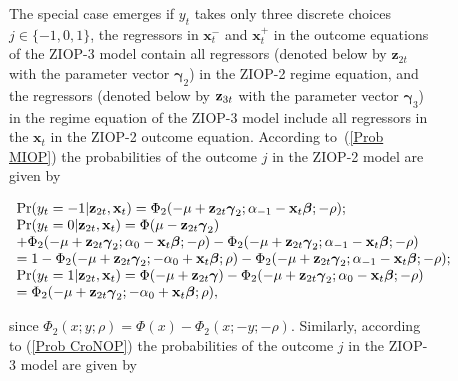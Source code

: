 \documentclass[letterpaper,fleqn,12pt]{article}
\begin{document}
\begin{figure}[H]
\begin{onehalfspace}
The special case emerges if $y_{t}$ takes only three discrete choices $j\in
\{-1,0,1\}$, the regressors in $\mathbf{x}_{t}^{-}$ and $\mathbf{x}_{t}^{+}$
in the outcome equations of the ZIOP-3 model contain all regressors (denoted
below by $\mathbf{z}_{2t}$ with the parameter vector $\mathbf{\gamma }_{2}$)
in the ZIOP-2 regime equation, and the regressors (denoted below by $\mathbf{%
z}_{3t}$ with the parameter vector $\mathbf{\gamma }_{3}$) in the regime
equation of the ZIOP-3 model include all regressors in the $\mathbf{x}_{t}$
in the ZIOP-2 outcome equation. According to\ (\ref{Prob MIOP}) the
probabilities of the outcome $j$ in the ZIOP-2 model are given by

\begin{flushleft}
\begin{equation}
\begin{array}{l}
\Pr (y_{t}=-1|\mathbf{z}_{2t},\mathbf{x}_{t})=\Phi _{2}(-\mu +\mathbf{z}_{2t}%
\mathbf{\gamma }_{2};\alpha _{-1}-\mathbf{x}_{t}\mathbf{\beta };\mathbf{-}%
\rho ); \\ 
\Pr (y_{t}=0|\mathbf{z}_{2t},\mathbf{x}_{t})=\Phi (\mu -\mathbf{z}_{2t}%
\mathbf{\gamma }_{2}) \\ 
+\Phi _{2}(-\mu +\mathbf{z}_{2t}\mathbf{\gamma }_{2};\alpha _{0}-\mathbf{x}%
_{t}\mathbf{\beta };\mathbf{-}\rho )-\Phi _{2}(-\mu +\mathbf{z}_{2t}\mathbf{%
\gamma }_{2};\alpha _{-1}-\mathbf{x}_{t}\mathbf{\beta };\mathbf{-}\rho ) \\ 
=1-\Phi _{2}(-\mu +\mathbf{z}_{2t}\mathbf{\gamma }_{2};-\alpha _{0}+\mathbf{x%
}_{t}\mathbf{\beta };\rho )-\Phi _{2}(-\mu +\mathbf{z}_{2t}\mathbf{\gamma }%
_{2};\alpha _{-1}-\mathbf{x}_{t}\mathbf{\beta };\mathbf{-}\rho ); \\ 
\Pr (y_{t}=1|\mathbf{z}_{2t},\mathbf{x}_{t})=\Phi (-\mu +\mathbf{z}_{2t}%
\mathbf{\gamma })-\Phi _{2}(-\mu +\mathbf{z}_{2t}\mathbf{\gamma }_{2};\alpha
_{0}-\mathbf{x}_{t}\mathbf{\beta };\mathbf{-}\rho ) \\ 
=\Phi _{2}(-\mu +\mathbf{z}_{2t}\mathbf{\gamma }_{2};-\alpha _{0}+\mathbf{x}%
_{t}\mathbf{\beta };\rho ),%
\end{array}
\label{Prob spec ZIOP-2}
\end{equation}
\end{flushleft}

\noindent since $\Phi _{2}(x;y;\rho )=\Phi (x)-\Phi _{2}(x;-y;-\rho )$.
Similarly, according to (\ref{Prob CroNOP}) the probabilities of the outcome 
$j$ in the ZIOP-3 model are given by


\end{onehalfspace}
\end{figure}
\end{document}
